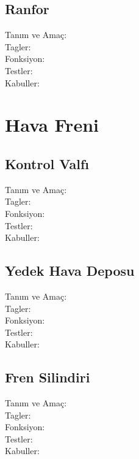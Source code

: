 \documentclass[10pt,a4paper]{article}
\begin{document}
\subsection{Ranfor}
\begin{description}
\item[Tanım ve Amaç:] 
\item[Tagler:]
\item[Fonksiyon:]
\item[Testler:]
\item[Kabuller:]
\end{description}

\newpage

\section{Hava Freni}

\subsection{Kontrol Valfı}
\begin{description}
\item[Tanım ve Amaç:] 
\item[Tagler:]
\item[Fonksiyon:]
\item[Testler:]
\item[Kabuller:]
\end{description}
\newpage

\subsection{Yedek Hava Deposu}
\begin{description}
\item[Tanım ve Amaç:] 
\item[Tagler:]
\item[Fonksiyon:]
\item[Testler:]
\item[Kabuller:]
\end{description}
\newpage

\subsection{Fren Silindiri}
\begin{description}
\item[Tanım ve Amaç:] 
\item[Tagler:]
\item[Fonksiyon:]
\item[Testler:]
\item[Kabuller:]
\end{description}
\newpage
\end{document}

